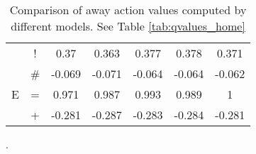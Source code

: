 \documentclass{sfuthesis}
\begin{document}
\begin{table}
\begin{tabular}{ccccccc}
			& \multicolumn{1}{c|}{!}                & 0.37               & 0.363                 & 0.377                & \multicolumn{1}{c|}{0.378}               & 0.371         \\
			& \multicolumn{1}{c|}{\#}               & -0.069             & -0.071                & -0.064               & \multicolumn{1}{c|}{-0.064}              & -0.062        \\ \hline
			E              & \multicolumn{1}{c|}{=}                & 0.971              & 0.987                 & 0.993                & \multicolumn{1}{c|}{0.989}               & 1             \\
			& \multicolumn{1}{c|}{+}                & -0.281             & -0.287                & -0.283               & \multicolumn{1}{c|}{-0.284}              & -0.281       
		\end{tabular}
		\caption{Comparison of away action values computed by different models. See Table \ref{tab:qvalues_home}}.
		\label{tab:qvalues_away}
	\end{table}
	
\end{document}
